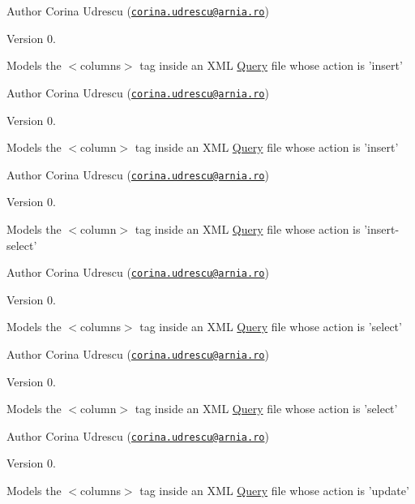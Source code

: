 \begin{DoxyAuthor}{Author}
Corina Udrescu (\href{mailto:corina.udrescu@arnia.ro}{\tt corina.\-udrescu@arnia.\-ro})  
\end{DoxyAuthor}
\begin{DoxyVersion}{Version}
0.
\end{DoxyVersion}
Models the $<$columns$>$ tag inside an X\-M\-L \hyperlink{classQuery}{Query} file whose action is 'insert'

\begin{DoxyAuthor}{Author}
Corina Udrescu (\href{mailto:corina.udrescu@arnia.ro}{\tt corina.\-udrescu@arnia.\-ro})  
\end{DoxyAuthor}
\begin{DoxyVersion}{Version}
0.
\end{DoxyVersion}
Models the $<$column$>$ tag inside an X\-M\-L \hyperlink{classQuery}{Query} file whose action is 'insert'

\begin{DoxyAuthor}{Author}
Corina Udrescu (\href{mailto:corina.udrescu@arnia.ro}{\tt corina.\-udrescu@arnia.\-ro})  
\end{DoxyAuthor}
\begin{DoxyVersion}{Version}
0.
\end{DoxyVersion}
Models the $<$column$>$ tag inside an X\-M\-L \hyperlink{classQuery}{Query} file whose action is 'insert-\/select'

\begin{DoxyAuthor}{Author}
Corina Udrescu (\href{mailto:corina.udrescu@arnia.ro}{\tt corina.\-udrescu@arnia.\-ro})  
\end{DoxyAuthor}
\begin{DoxyVersion}{Version}
0.
\end{DoxyVersion}
Models the $<$columns$>$ tag inside an X\-M\-L \hyperlink{classQuery}{Query} file whose action is 'select'

\begin{DoxyAuthor}{Author}
Corina Udrescu (\href{mailto:corina.udrescu@arnia.ro}{\tt corina.\-udrescu@arnia.\-ro})  
\end{DoxyAuthor}
\begin{DoxyVersion}{Version}
0.
\end{DoxyVersion}
Models the $<$column$>$ tag inside an X\-M\-L \hyperlink{classQuery}{Query} file whose action is 'select'

\begin{DoxyAuthor}{Author}
Corina Udrescu (\href{mailto:corina.udrescu@arnia.ro}{\tt corina.\-udrescu@arnia.\-ro})  
\end{DoxyAuthor}
\begin{DoxyVersion}{Version}
0.
\end{DoxyVersion}
Models the $<$columns$>$ tag inside an X\-M\-L \hyperlink{classQuery}{Query} file whose action is 'update'

